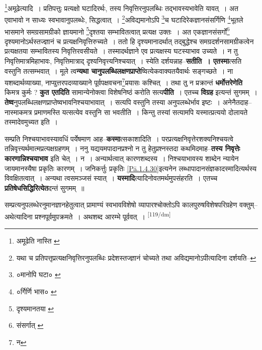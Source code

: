 \documentclass[article,12pt,a4paper]{memoir}
\begin{document}
	\footnote{अमूढेति \cite{dp-msA} \cite{dp-edP} \cite{dp-edE} नास्ति \cite{dp-edH} \cite{dp-edN}}अमूढेत्यादि । प्रतिपत्तुः प्रत्यक्षो घटादिरर्थः, तस्य निवृत्तिरनुपलब्धिः तद्भावस्यभावेति यावत् । अत एवाभावो न साध्यः स्वभावानुपलब्धेः, सिद्धत्वात् । \footnote{यथा च प्रतिपत्तृप्रत्यक्षनिवृत्तिरनुपलब्धिः प्रदेशस्तज्ज्ञानं चोच्यते तथा अविद्यमानोऽपीत्यादिना दर्शयति--\cite{dp-msD-n}}अविद्यमानोऽपि \footnote{०मानोपि घटा० \cite{dp-msC}}च घटादिरेकज्ञानसंसर्गिणि \footnote{०र्गिर्णि भास० \cite{dp-msA} \cite{dp-edE} \cite{dp-edP}}भूतले भासमाने समग्रसामग्रीको ज्ञायमानो \footnote{दृश्यमानतया \cite{dp-msB} \cite{dp-msD} \cite{dp-edH} \cite{dp-edN}}दृश्तया सम्भावितत्वात् प्रत्यक्ष उक्तः । अत एकज्ञानसंसर्गो\footnote{संसर्गात् \cite{dp-msB}} दृश्यमानोऽर्थस्तज्ज्ञानं च प्रत्यक्षनिवृत्तिरुच्यते । ततो हि दृश्यमानादर्थात् तद्बुद्धेश्च समग्रदर्शनसामग्रीकत्वेन प्रत्यक्षतया सम्भावितस्य निवृत्तिरवसीयते । तस्मादर्थज्ञाने एव प्रत्यक्षस्य घटस्याभाव उच्यते । न तु निवृत्तिमात्रमिहाभावः, निवृत्तिमात्राद् दृश्यनिवृत्त्यनिश्चयात् । स्येति दर्शयन्नाह--\textbf{सतीति । एतस्मा}त्सति वस्तुनि तत्सम्भवात् । मूले त्व\textbf{न्यथा चानुपलब्धिलक्षणप्राप्ते}ष्वित्येकवाक्यतयैवार्थः सङ्गच्छते । ना यशब्दार्थव्याख्या, नाप्युत्तरपदव्याख्याने पूर्वपक्षवचना\footnote{न}प्रयासः कश्चित् । तथा तु न प्रक्रान्तं \textbf{धर्मोत्तरेणेति} किमत्र कुर्मः ? \textbf{कुत एतदिति} सामान्येनोक्त्वा विशेषनिष्ठं करोति सत्य\textbf{पीति} । एतच्च \textbf{विग्रह} इत्यन्तं सुगमम् । \textbf{तेष्व}नुपलब्धिलक्षणप्राप्तेष्वभावनिश्चयाभावात् । सत्यपि वस्तुनि तस्या अनुपलब्धेर्भाव इष्टः । अनेनैतदाह--नास्माकमत्र प्रमाणमस्ति यत्सत्येव वस्तुनि सा भवतीति । किन्तु तस्यां सत्यामपि यस्मात्प्रत्ययो दोलायते तस्मादेवमुच्यत इति ।
	\pend
      

	  \pstart सम्प्रति निश्चयाभावस्यावधिं पर्येषमाण आह--\textbf{कस्मा}त्सकाशादिति । परप्रत्यक्षनिवृत्तेरशक्यनिश्चयत्वे तन्निवृत्त्यर्थमात्मप्रत्यक्षग्रहणम् । ननु यद्ययमपादानप्रश्नो न तु हेतुप्रश्नस्तदा कथमिदमाह--\textbf{तस्य निवृत्तेः कारणान्निश्चयाभाव} इति चेत् । न । अन्यार्थत्वात् कारणशब्दस्य । निश्चयाभावस्य शाब्देन न्यायेन जायमानस्यैषा प्रकृतिः कारणम् । जनिकर्त्तुः प्रकृतिः \cref{Pā.1.4.30}इत्यनेन लब्धापादानसंज्ञकादस्मादित्यर्थस्य विवक्षितत्वात् । अन्यथा त्वसमञ्जसं स्यात् । \textbf{यस्मादि}त्यादिनोवतमर्थमुपसंहरति । एतच्च \textbf{प्रतिषेधसिद्धिरित्येत}दन्तं सुगमम् ॥
	\pend
      

	  \pstart सम्प्रत्यनुपलब्धेरनुमानज्ञानहेतुत्वात् प्रामाण्यं स्वभावविशेषो व्यापारश्चोक्तोऽपि कालपुरुषविशेषपरिग्रहेण वक्तुम्--अथेत्यादिना प्रश्नपूर्वमुपक्रमते । अथशब्द आरम्भे पूर्ववत् ।
	\pend
      \leavevmode\textsuperscript{\rmlatinfont\tiny [119/dm]}
\end{document}
